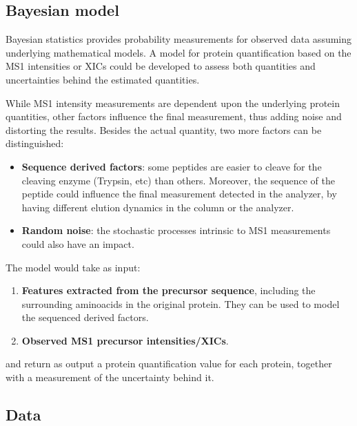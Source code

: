 \documentclass[11pt, a4paper]{report}
\begin{document}
\subsection{Bayesian model}

Bayesian statistics provides probability measurements for observed data assuming underlying mathematical models. A model for protein quantification based on the \ac{MS1} intensities or XICs could be developed to assess both quantities and uncertainties behind the estimated quantities.

While \ac{MS1} intensity measurements are dependent upon the underlying protein quantities, other factors influence the final measurement, thus adding noise and distorting the results. Besides the actual quantity, two more factors can be distinguished:

\begin{itemize}

\item \textbf{Sequence derived factors}: some peptides are easier to cleave for the cleaving enzyme (Trypsin, etc) than others. Moreover, the sequence of the peptide could influence the final measurement detected in the analyzer, by having different elution dynamics in the column or the analyzer.

\item \textbf{Random noise}: the stochastic processes intrinsic to \ac{MS1} measurements could also have an impact.

\end{itemize}

The model would take as input:

\begin{enumerate}

\item \textbf{Features extracted from the precursor sequence}, including the surrounding aminoacids in the original protein. They can be used to model the sequenced derived factors.

\item \textbf{Observed \ac{MS1} precursor intensities/XICs}.

\end{enumerate}

and return as output a protein quantification value for each protein, together with a measurement of the uncertainty behind it.




\subsection{Data}
\end{document}
